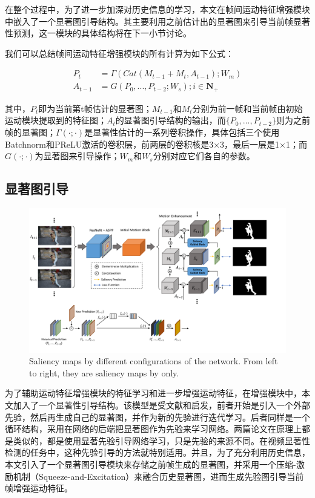 在整个过程中，为了进一步加深对历史信息的学习，本文在帧间运动特征增强模块中嵌入了一个显著图引导结构。其主要利用之前估计出的显著图来引导当前帧显著性预测，这一模块的具体结构将在下一小节讨论。

我们可以总结帧间运动特征增强模块的所有计算为如下公式：

\begin{equation}
\label{gru}
\begin{aligned}
   P_{t}  &= \Gamma(Cat(M_{t-1} + M_{t}, A_{t-1});W_m) \\
   A_{t-1}  &= G(P_0, ..., P_{t-2};W_s); i \in \bm{N_{+}}
 \end{aligned}
\end{equation}

其中，$P_{t}$即为当前第t帧估计的显著图；$M_{t-1}$和$M_{t}$分别为前一帧和当前帧由初始运动模块提取到的特征图；$A_{t}$的显著图引导结构的输出，而$\{P_0, ..., P_{t-2}\}$则为之前帧的显著图；$\Gamma(\cdot;\cdot)$是显著性估计的一系列卷积操作，具体包括三个使用Batchnorm和PReLU激活的卷积层，前两层的卷积核是3$\times$3，最后一层是1$\times$1；而$G(\cdot;\cdot)$为显著图来引导操作；$W_{m}$和$W_{s}$分别对应它们各自的参数。

\subsection{显著图引导}

\begin{figure}
\center
\includegraphics[width=1\textwidth]{figures/se}
\caption{Saliency maps by different configurations of the network. From left to right, they are saliency maps by only.}
\label{se}
\end{figure}

为了辅助运动特征增强模块的特征学习和进一步增强运动特征，在增强模块中，本文加入了一个显著性引导结构。该模型是受文献\cite{wang2016saliency}和\cite{deng2018r3net}启发，前者开始是引入一个外部先验，然后再生成自己的显著图，并作为新的先验进行迭代学习。后者同样是一个循环结构，采用在网络的后端把显著图作为先验来学习网络。两篇论文在原理上都是类似的，都是使用显著先验引导网络学习，只是先验的来源不同。在视频显著性检测的任务中，这种先验引导的方法就特别适用。并且，为了充分利用历史信息，本文引入了一个显著图引导模块来存储之前帧生成的显著图，并采用一个压缩-激励机制（Squeeze-and-Excitation）来融合历史显著图，进而生成先验图引导当前帧增强运动特征。

